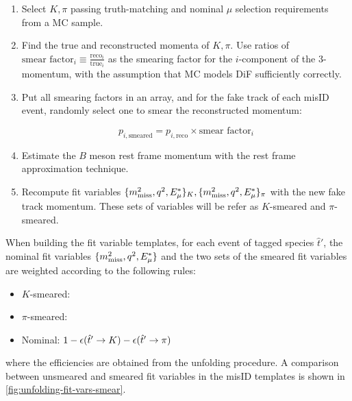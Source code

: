 \begin{enumerate}
    \item Select $K, \pi$ passing truth-matching and nominal $\mu$ selection
        requirements from a MC sample.

    \item Find the true and reconstructed momenta of
        $K, \pi$.
        Use ratios of
        $\text{smear factor}_i \equiv \frac{\text{reco}_i}{\text{true}_i}$
        as the smearing factor for the $i$-component of the 3-momentum,
        with the assumption that MC models DiF sufficiently correctly.

    \item Put all smearing factors in an array,
        and for the fake \muon track of each misID event,
        randomly select one to smear the reconstructed momentum:

        \begin{equation}
            p_{i,\text{smeared}} =
                p_{i,\text{reco}} \times \text{smear factor}_i
        \end{equation}

    \item Estimate the $B$ meson rest frame momentum with the rest frame
        approximation technique. %
    \item Recompute fit variables
        $\{\mmSq, \qSq, \el\}_K, \{\mmSq, \qSq, \el\}_\pi$
        with the new fake \muon track momentum.
        These sets of variables will be refer as $K$-smeared and $\pi$-smeared.
\end{enumerate}

When building the fit variable templates, for each event of tagged species
$\hat{t}'$,
the nominal fit variables $\{\mmSq, \qSq, \el\}$ and the two sets of the smeared
fit variables are weighted according to the following rules:

\begin{itemize}
    \item $K$-smeared: 
    \item $\pi$-smeared: \misEff[\hat{t}']{\pi}
    \item Nominal: $1 - \misEff[\hat{t}']{K} - \misEff[\hat{t}']{\pi}$
\end{itemize}
where the efficiencies are obtained from the unfolding procedure.
A comparison between unsmeared and smeared fit variables in the misID templates
is shown in \cref{fig:unfolding-fit-vars-smear}.

